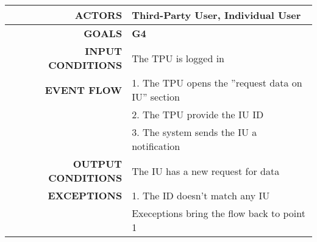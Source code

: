 \begin{table}[h!]
\begin{tabular}{|r|p{3in}|}
\hline
\textbf{ACTORS} & Third-Party User, Individual User\\
\hline
\textbf{GOALS} & \textbf{G4}\\
\hline
\textbf{INPUT CONDITIONS} & The TPU is logged in\\
\hline
\textbf{EVENT FLOW} 
&1. The TPU opens the ''request data on IU'' section \\
&2. The TPU provide the IU ID \\
&3. The system sends the IU a notification \\
\hline
\textbf{OUTPUT CONDITIONS} & The IU has a new request for data \\
\hline
\textbf{EXCEPTIONS} 
&1. The ID doesn't match any IU \\
&Execeptions bring the flow back to point 1 \\
\hline
\end{tabular}
\end{table}